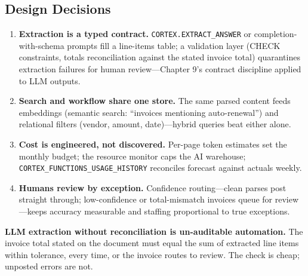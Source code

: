 \subsection{Design Decisions}
\begin{enumerate}
    \item \textbf{Extraction is a typed contract.} \texttt{CORTEX.EXTRACT\_ANSWER} or completion-with-schema prompts fill a line-items table; a validation layer (CHECK constraints, totals reconciliation against the stated invoice total) quarantines extraction failures for human review---Chapter 9's contract discipline applied to LLM outputs.
    \item \textbf{Search and workflow share one store.} The same parsed content feeds embeddings (semantic search: ``invoices mentioning auto-renewal'') and relational filters (vendor, amount, date)---hybrid queries beat either alone.
    \item \textbf{Cost is engineered, not discovered.} Per-page token estimates set the monthly budget; the resource monitor caps the AI warehouse; \texttt{CORTEX\_FUNCTIONS\_USAGE\_HISTORY} reconciles forecast against actuals weekly.
    \item \textbf{Humans review by exception.} Confidence routing---clean parses post straight through; low-confidence or total-mismatch invoices queue for review---keeps accuracy measurable and staffing proportional to true exceptions.
\end{enumerate}

\begin{pitfall}
\textbf{LLM extraction without reconciliation is un-auditable automation.} The invoice total stated on the document must equal the sum of extracted line items within tolerance, every time, or the invoice routes to review. The check is cheap; unposted errors are not.
\end{pitfall}

